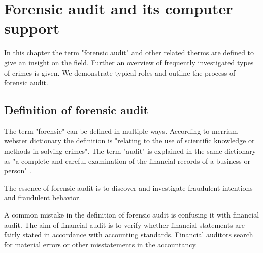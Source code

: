 \chapter{Forensic audit and its computer support}




In this chapter the term "forensic audit" and other related therms are defined to give an insight on the field. Further an overview of frequently investigated types of crimes is given. We demonstrate typical roles and outline the process of forensic audit. 


\section{Definition of forensic audit}\label{FA_definition}
The term "forensic" can be defined in multiple ways. According to merriam-webster dictionary \cite{merriam-forensic} the definition is "relating to the use of scientific knowledge or methods in solving crimes". The term "audit" is explained in the same dictionary as "a complete and careful examination of the financial records of a business or person" \cite{merriam-audit}.

The essence of forensic audit is to discover and investigate fraudulent intentions and fraudulent behavior. 

A common mistake in the definition of forensic audit is confusing it with financial audit. The aim of financial audit is to verify whether financial statements are fairly stated in accordance with accounting standards. Financial auditors search for material errors or other misstatements in the accountancy.


